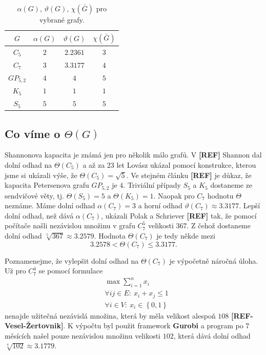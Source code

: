 \begin{table}[h!]
    \centering
    \begin{tabular}{ c | c c c }
        $G$        & $\alpha(G)$ & $\vartheta(G)$ & $\chi(\bar{G})$ \\
        \hline
        $C_5$      & $2$         & $2.2361$       & $3$ \\  
        $C_7$      & $3$         & $3.3177$       & $4$ \\
        $GP_{5,2}$ & $4$         & $4$            & $5$ \\
        $K_5$      & $1$         & $1$            & $1$ \\
        $S_5$      & $5$         & $5$            & $5$
    \end{tabular}
    \caption{$\alpha(G)$, $\vartheta(G)$, $\chi(\bar{G})$ pro vybrané grafy.}
    \label{tab:sandwitch}
\end{table}

\subsection*{Co víme o $\Theta(G)$}

Shannonova kapacita je známá jen pro několik málo grafů. V \textbf{[REF]} Shannon dal dolní odhad na $\Theta(C_5)$ a až za 23 let Lovász ukázal pomocí konstrukce, kterou jsme si ukázali výše, že $\Theta(C_5) = \sqrt{5}$. Ve stejném článku \textbf{[REF]} je důkaz, že kapacita Petersenova grafu $GP_{5,2}$ je $4$. Triviální případy $S_5$ a $K_5$ dostaneme ze sendvičové věty, tj. $\Theta(S_5) = 5$ a $\Theta(K_5) = 1$. Naopak pro $C_7$ hodnotu $\Theta$ neznáme. Máme dolní odhad $\alpha(C_7) = 3$ a horní odhad $\vartheta(C_7) \approx 3.3177$. Lepší dolní odhad, než dává $\alpha(C_7)$, ukázali Polak a Schriever \textbf{[REF]} tak, že pomocí počítače našli nezávislou množinu v grafu $C_7^5$ velikosti $367$. Z čehož dostaneme dolní odhad $\sqrt[5]{367} \approx 3.2579$. Hodnota $\Theta(C_7)$ je tedy někde mezi
$$
    3.2578 < \Theta(C_7) \leq 3.3177.
$$

Poznamenejme, že vylepšit dolní odhad na $\Theta(C_7)$ je výpočetně náročná úloha. Už pro $C_7^4$ se pomocí formulace
\begin{equation*}
    \begin{split}
        &\max \sum_{i=1}^n x_i \\
        &\forall ij \in E:\ x_i + x_j \leq 1 \\
        &\forall i \in V:\ x_i \in \left\{ 0, 1 \right\}
    \end{split}
\end{equation*}
nenajde užitečná nezávislá množina, která by měla velikost alespoň $108$ \textbf{[REF-Vesel-Žertovnik]}. K výpočtu byl použit framework \textbf{Gurobi} a program po $7$ měsících našel pouze nezávislou množinu velikosti $102$, která dává dolní odhad $\sqrt[4]{102} \approx 3.1779$.


